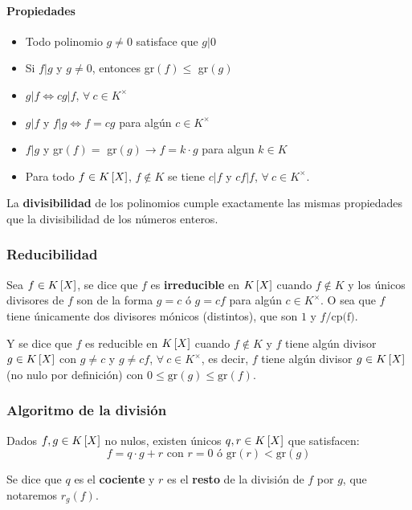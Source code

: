 \paragraph{Propiedades}
\begin{itemize}
    \item Todo polinomio $g\neq 0$ satisface que $g|0$
    \item Si $f|g$ y $g\neq 0$, entonces gr$(f) \leq$ gr$(g)$
    \item $g|f\iff cg|f$, $\forall~c\in K^\times$
    \item $g|f$ y $f|g\iff f = cg$ para algún $c\in K^\times$
    \item $f|g$ y gr$(f) =$ gr$(g)\to f = k\cdot g$ para algun $k\in K$ 
    \item Para todo $f\in K\left[X\right]$, $f\not\in K$ se tiene $c|f$ y $cf|f$, $\forall~c\in K^\times$.
\end{itemize}

La \textbf{divisibilidad} de los polinomios cumple exactamente las mismas propiedades que la divisibilidad de los números enteros.

\subsubsection{Reducibilidad}
Sea $f\in K\left[X\right]$, se dice que $f$ es \textbf{irreducible} en $K\left[X\right]$ cuando $f\not\in K$ y los únicos divisores de $f$ son de la forma $g=c$ ó $g = cf$ para algún $c\in K^\times$. O sea que $f$ tiene únicamente dos divisores mónicos (distintos), que son $1$ y $f/\text{cp(f)}$.

Y se dice que $f$ es reducible en $K\left[X\right]$ cuando $f\not\in K$ y $f$ tiene algún divisor $g\in K\left[X\right]$ con $g\neq c$ y $g\neq cf$, $\forall~c\in K^\times$, es decir, $f$ tiene algún divisor $g\in K\left[X\right]$ (no nulo por definición) con $0\leq \text{gr}(g)\leq\text{gr}(f)$.

\subsubsection{Algoritmo de la división}
Dados $f,g\in K\left[X\right]$ no nulos, existen únicos $q,r\in K\left[X\right]$ que satisfacen:
\begin{equation*}
    f = q\cdot g + r \text{ con } r = 0 \text{ ó gr}(r) < \text{gr}(g) 
\end{equation*}

Se dice que $q$ es el \textbf{cociente} y $r$ es el \textbf{resto} de la división de $f$  por $g$, que notaremos $r_g(f)$.

